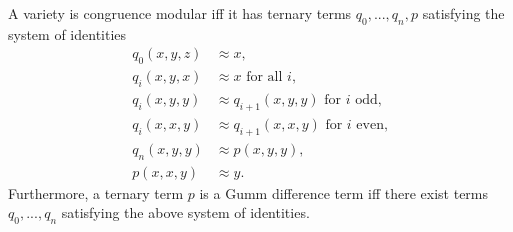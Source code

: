\documentclass[letterpaper,11pt]{article}
\begin{document}
\begin{thm}\label{gumm-terms} A variety is congruence modular iff it has ternary terms $q_0, ..., q_n, p$ satisfying the system of identities
\begin{align*}
q_0(x,y,z) &\approx x,\\
q_i(x,y,x) &\approx x\text{ for all }i,\\
q_i(x,y,y) &\approx q_{i+1}(x,y,y)\text{ for }i\text{ odd,}\\
q_i(x,x,y) &\approx q_{i+1}(x,x,y)\text{ for }i\text{ even,}\\
q_n(x,y,y) &\approx p(x,y,y),\\
p(x,x,y) &\approx y.
\end{align*}
Furthermore, a ternary term $p$ is a Gumm difference term iff there exist terms $q_0, ..., q_n$ satisfying the above system of identities.
\end{thm}
\end{document}
